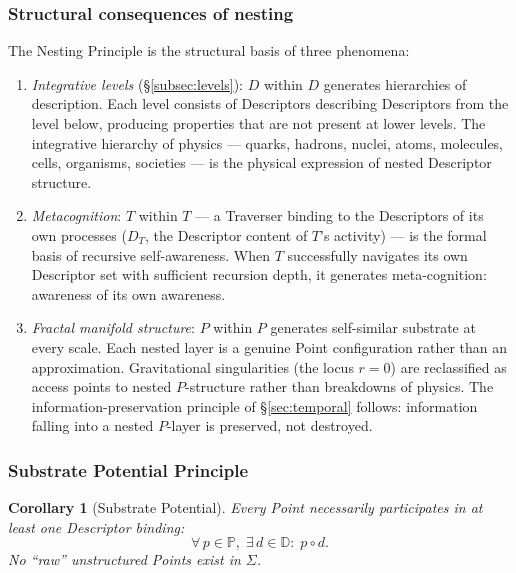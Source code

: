 \documentclass[11pt,a4paper]{article}
\newtheorem{corollary}[theorem]{Corollary}
\theoremstyle{definition}
\theoremstyle{remark}
\begin{document}
\subsubsection{Structural consequences of nesting}

The Nesting Principle is the structural basis of three phenomena:

\begin{enumerate}[label=(\roman*),leftmargin=*]
\item \emph{Integrative levels} (\S\ref{subsec:levels}): $D$ within $D$ generates hierarchies of description. Each level consists of Descriptors describing Descriptors from the level below, producing properties that are not present at lower levels. The integrative hierarchy of physics --- quarks, hadrons, nuclei, atoms, molecules, cells, organisms, societies --- is the physical expression of nested Descriptor structure.
\item \emph{Metacognition}: $T$ within $T$ --- a Traverser binding to the Descriptors of its own processes ($D_{T}$, the Descriptor content of $T$'s activity) --- is the formal basis of recursive self-awareness. When $T$ successfully navigates its own Descriptor set with sufficient recursion depth, it generates meta-cognition: awareness of its own awareness.
\item \emph{Fractal manifold structure}: $P$ within $P$ generates self-similar substrate at every scale. Each nested layer is a genuine Point configuration rather than an approximation. Gravitational singularities (the locus $r = 0$) are reclassified as access points to nested $P$-structure rather than breakdowns of physics. The information-preservation principle of \S\ref{sec:temporal} follows: information falling into a nested $P$-layer is preserved, not destroyed.
\end{enumerate}

\subsubsection{Substrate Potential Principle}\label{subsubsec:substrate-potential}

\begin{corollary}[Substrate Potential]\label{cor:substrate-potential}
Every Point necessarily participates in at least one Descriptor binding:
\[
\forall\, p \in \mathbb{P},\; \exists\, d \in \mathbb{D} :\; p \circ d.
\]
No ``raw'' unstructured Points exist in $\Sigma$.
\end{corollary}
\end{document}
